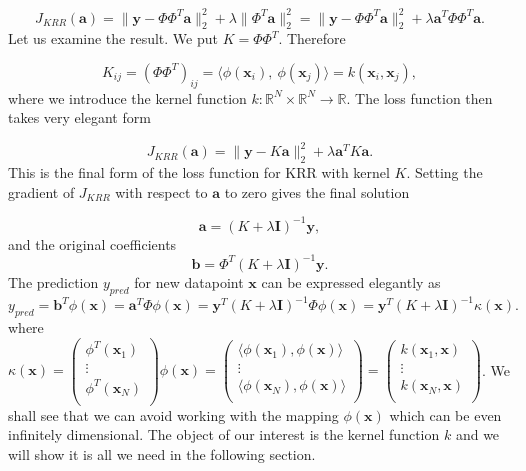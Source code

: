 \documentclass[11pt,american]{book} %
\theoremstyle{plain}
\theoremstyle{definition}
\begin{document}
\begin{equation}
	J_{KRR}(\bm{a}) = \| \bm{y} - \Phi \Phi^T \bm{a} \|^2_2 + \lambda \| \Phi^T \bm{a} \|^2_2 = \| \bm{y} - \Phi \Phi^T \bm{a} \|^2_2 + \lambda \bm{a}^T \Phi \Phi^T \bm{a}.
\end{equation}
Let us examine the result. We put  $K = \Phi \Phi^T$. Therefore

\begin{equation}
	K_{ij} = (\Phi \Phi^T)_{ij} =  \langle \phi(\bm{x}_i), \  \phi(\bm{x}_j) \rangle = k(\bm{x}_i, \bm{x}_j),
\end{equation}
where we introduce the kernel function $k: \mathbb{R}^N \times \mathbb{R}^N \rightarrow \mathbb{R}$. The loss function then takes very elegant form

\begin{equation}
	J_{KRR}(\bm{a}) = \|\bm{y} - K \bm{a} \|^2_2 + \lambda \bm{a}^T K \bm{a}.
\end{equation}
This is the final form of the loss function for KRR with kernel $K$. Setting the gradient of $J_{KRR}$ with respect to $\bm{a}$ to zero gives the final solution

\begin{equation}
	\bm{a} = (K + \lambda \bm{I})^{-1} \bm{y},
\end{equation}
and the original coefficients
\begin{equation}
	\bm{b} = \Phi^T (K + \lambda \bm{I})^{-1} \bm{y}.
\end{equation}
The prediction $y_{pred}$ for new datapoint $\bm{x}$ can be expressed elegantly as
\begin{equation}
	y_{pred} = \bm{b}^T \phi(\bm{x}) = \bm{a}^T \Phi \phi(\bm{x}) = \bm{y}^T (K + \lambda \bm{I})^{-1} \Phi \phi(\bm{x}) = \bm{y}^T (K + \lambda \bm{I})^{-1} \kappa(\bm{x}).
\end{equation}
where $\kappa(\bm{x}) = \begin{pmatrix}
	\phi^T (\bm{x}_1) \\
	\vdots \\
	\phi^T (\bm{x}_N) \\
\end{pmatrix} \phi(\bm{x}) = \begin{pmatrix}
	\langle \phi (\bm{x}_1), \phi(\bm{x}) \rangle \\
	\vdots \\
	\langle \phi (\bm{x}_N), \phi(\bm{x}) \rangle \\
\end{pmatrix} = \begin{pmatrix}
	k(\bm{x}_1, \bm{x}) \\
	\vdots \\
	k(\bm{x}_N, \bm{x}) \\
\end{pmatrix}$. We shall see that we can avoid working with the mapping $\phi(\bm{x})$ which can be even infinitely dimensional. The object of our interest is the kernel function $k$ and we will show it is all we need in the following section.
\end{document}

